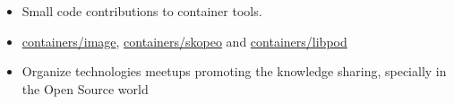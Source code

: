 \documentclass[10pt,a4paper]{altacv}
\begin{document}
\begin{itemize}
\item Small code contributions to container tools.
\item \href{https://github.com/containers/image/commits?author=jvanz}{containers/image},  \href{https://github.com/containers/skopeo/commits?author=jvanz}{containers/skopeo} and \href{https://github.com/containers/libpod/commits?author=jvanz}{containers/libpod}
\end{itemize}

\begin{itemize}
\item Organize technologies meetups promoting the knowledge sharing, specially in the Open Source world
\end{itemize}

\clearpage
\end{document}
